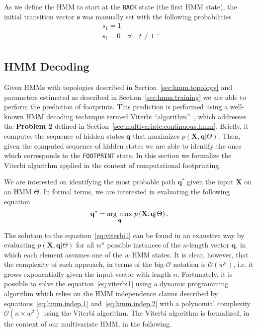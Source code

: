 As we define the HMM to start at the {\tt BACK} state (the first HMM state), the initial transition vector $\mathbf{s}$ was manually set with the following probabilities
\begin{equation}
  \label{eq:hmm.train.s}
  \begin{array}{lcl}
    s_1 = 1 \\
    s_t = 0 \quad \forall \quad t \neq 1 \\
  \end{array}.
\end{equation}

\subsection{HMM Decoding}
\label{sec:hmm.decoding}

Given HMMs with topologies described in Section~\ref{sec:hmm.topology} and parameters estimated as described in Section~\ref{sec:hmm.training} we are able to perform the prediction of footprints. This prediction is performed using a well-known HMM decoding technique termed Viterbi ``algorithm''~\citep{rabiner1989}, which addresses the {\bf Problem 2} defined in Section~\ref{sec:multivariate.continuous.hmm}. Briefly, it computes the sequence of hidden states $ \mathbf{q} $ that maximizes $ p\left( \mathbf{X}, \mathbf{q} | \Theta \right) $. Then, given the computed sequence of hidden states we are able to identify the ones which corresponds to the {\tt FOOTPRINT} state. In this section we formalize the Viterbi algorithm applied in the context of computational footprinting.

We are interested on identifying the most probable path $ \mathbf{q^*} $ given the input $ \mathbf{X} $ on an HMM $ \Theta $. In formal terms, we are interested in evaluating the following equation
\begin{equation}
  \label{eq:viterbi1}
  \mathbf{q^*} = \argmax{\mathbf{q}} p\left(\mathbf{X}, \mathbf{q} | \Theta \right).
\end{equation}

The solution to the equation~\ref{eq:viterbi1} can be found in an exaustive way by evaluating $ p\left(\mathbf{X}, \mathbf{q} | \Theta \right) $ for all $ {w}^{n} $ possible instances of the $n$-length vector $ \mathbf{q} $, in which each element assumes one of the $w$ HMM states. It is clear, however, that the complexity of such approach, in terms of the big-$\mathcal{O}$ notation is $ \mathcal{O}({w}^{n}) $, i.e. it grows exponentially given the input vector with length $n$. Fortunately, it is possible to solve the equation~\ref{eq:viterbi1} using a dynamic programming algorithm which relies on the HMM independence claims described by equations~\ref{eq:hmm.indep.1} and~\ref{eq:hmm.indep.2} with a polynomial complexity $ \mathcal{O}(n \times {w}^2) $ using the Viterbi algorithm. The Viterbi algorithm is formalized, in the context of our multivariate HMM, in the following.

